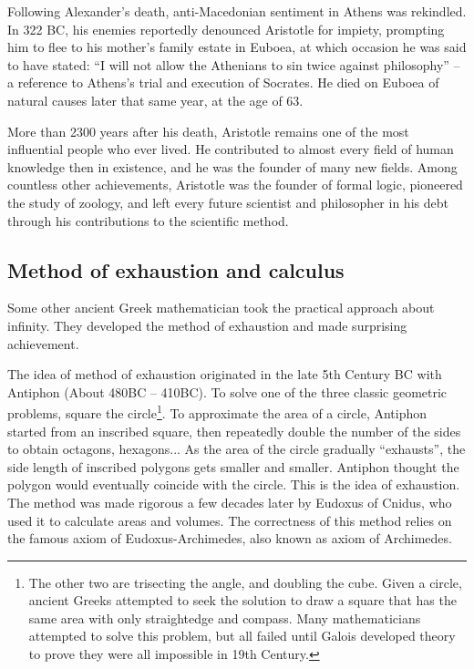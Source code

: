\documentclass{article}
\begin{document}
Following Alexander's death, anti-Macedonian sentiment in Athens was rekindled. In 322 BC, his enemies reportedly denounced Aristotle for impiety, prompting him to flee to his mother's family estate in Euboea, at which occasion he was said to have stated: ``I will not allow the Athenians to sin twice against philosophy'' – a reference to Athens's trial and execution of Socrates. He died on Euboea of natural causes later that same year, at the age of 63.

More than 2300 years after his death, Aristotle remains one of the most influential people who ever lived. He contributed to almost every field of human knowledge then in existence, and he was the founder of many new fields. Among countless other achievements, Aristotle was the founder of formal logic, pioneered the study of zoology, and left every future scientist and philosopher in his debt through his contributions to the scientific method.

\subsection{Method of exhaustion and calculus}

Some other ancient Greek mathematician took the practical approach about infinity. They developed the method of exhaustion and made surprising achievement.

The idea of method of exhaustion originated in the late 5th Century BC with Antiphon (About 480BC -- 410BC). To solve one of the three classic geometric problems, square the circle\footnote{The other two are trisecting the angle, and doubling the cube. Given a circle, ancient Greeks attempted to seek the solution to draw a square that has the same area with only straightedge and compass. Many mathematicians attempted to solve this problem, but all failed until Galois developed theory to prove they were all impossible in 19th Century.}. To approximate the area of a circle, Antiphon started from an inscribed square, then repeatedly double the number of the sides to obtain octagons, hexagons... As the area of the circle gradually ``exhausts'', the side length of inscribed polygons gets smaller and smaller. Antiphon thought the polygon would eventually coincide with the circle. This is the idea of exhaustion. The method was made rigorous a few decades later by Eudoxus of Cnidus, who used it to calculate areas and volumes. The correctness of this method relies on the famous axiom of Eudoxus-Archimedes, also known as axiom of Archimedes.
\end{document}
